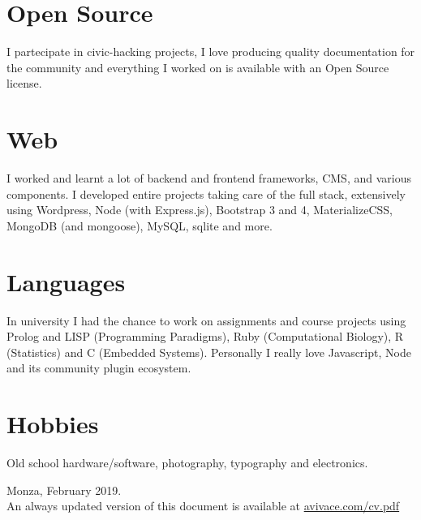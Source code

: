 \documentclass[11pt]{res} %
\begin{document}
\begin{resume}
\section{Open Source}
I partecipate in civic-hacking projects, I love producing quality documentation for the community and everything I worked on is available with an Open Source license.

\section{Web}
I worked and learnt a lot of backend and frontend frameworks, CMS, and various components. I developed entire projects taking care of the full stack, extensively using Wordpress, Node (with Express.js), Bootstrap 3 and 4, MaterializeCSS, MongoDB (and mongoose), MySQL, sqlite and more.

\section{Languages}
In university I had the chance to work on assignments and course projects using Prolog and LISP (Programming Paradigms), Ruby (Computational Biology), R (Statistics) and C (Embedded Systems). Personally I really love Javascript, Node and its community plugin ecosystem.

\section{Hobbies}
Old school hardware/software, photography, typography and electronics. 

\vspace*{\fill}

{\small Monza, February 2019.\\
An always updated version of this document is available at \href{https://avivace.com/cv.pdf}{avivace.com/cv.pdf}}

\end{resume} 
\end{document}
